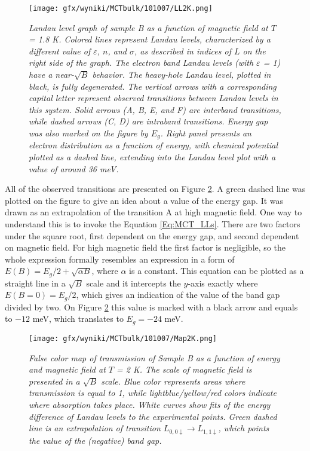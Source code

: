 \documentclass[titlepage,a4paper]{book}
\begin{document}
\begin{figure}[ht]
	\centering
	\texttt{[image: gfx/wyniki/MCTbulk/101007/LL2K.png]}
	\vspace{-10pt}
	\caption{\textit{Landau level graph of sample B as a function of magnetic field at $T$ = 1.8 K. Colored lines represent Landau levels, characterized by a different value of $\varepsilon$, $n$, and $\sigma$, as described in indices of $L$ on the right side of the graph. The electron band Landau levels (with $\varepsilon$ = 1) have a near-$\sqrt{B}$ behavior. The heavy-hole Landau level, plotted in black, is fully degenerated. The vertical arrows with a corresponding capital letter represent observed transitions between Landau levels in this system. Solid arrows (A, B, E, and F) are interband transitions, while dashed arrows (C, D) are intraband transitions. Energy gap was also marked on the figure by $E_g$. Right panel presents an electron distribution as a function of energy, with chemical potential plotted as a dashed line, extending into the Landau level plot with a value of around 36 meV.}}
	\label{fig:LL_101007_2K}
\end{figure}

All of the observed transitions are presented on Figure \ref{fig:Map_101007_2K}. A green dashed line was plotted on the figure to give an idea about a value of the energy gap. It was drawn as an extrapolation of the transition A at high magnetic field. One way to understand this is to invoke the Equation \ref{Eq:MCT_LLs}. There are two factors under the square root, first dependent on the energy gap, and second dependent on magnetic field. For high magnetic field the first factor is negligible, so the whole expression formally resembles an expression in a form of $E(B) = E_g/2 + \sqrt{\alpha B} $, where $\alpha$ is a constant. This equation can be plotted as a straight line in a $\sqrt{B}$ scale and it intercepts the $y$-axis exactly where $E(B = 0) = E_g/2$, which gives an indication of the value of the band gap divided by two. On Figure \ref{fig:Map_101007_2K} this value is marked with a black arrow and equals to $-12$ meV, which translates to $E_g = -24$ meV.

\begin{figure}[H]
	\centering
	\texttt{[image: gfx/wyniki/MCTbulk/101007/Map2K.png]}
	\vspace{-10pt}
	\caption{\textit{False color map of transmission of Sample B as a function of energy and magnetic field at $T$ = 2 K. The scale of magnetic field is presented in a $\sqrt{B}$ scale. Blue color represents areas where transmission is equal to 1, while lightblue/yellow/red colors indicate where absorption takes place. White curves show fits of the energy difference of Landau levels to the experimental points. Green dashed line is an extrapolation of transition $L_{0,0\downarrow}\rightarrow L_{1,1\downarrow}$, which points the value of the (negative) band gap.}}
	\label{fig:Map_101007_2K}
\end{figure} 
\end{document}
